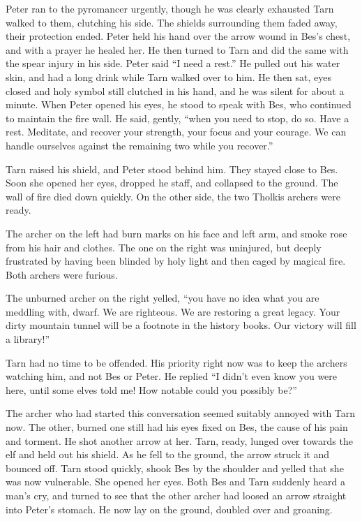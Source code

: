 Peter ran to the pyromancer urgently, though he was clearly exhausted  Tarn walked to them, clutching his side.  The shields surrounding them faded away, their protection ended.  Peter held his hand over the arrow wound in Bes's chest, and with a prayer he healed her.  He then turned to Tarn and did the same with the spear injury in his side.  Peter said ``I need a rest.''  He pulled out his water skin, and had a long drink while Tarn walked over to him.  He then sat, eyes closed and holy symbol still clutched in his hand, and he was silent for about a minute.  When Peter opened his eyes, he stood to speak with Bes, who continued to maintain the fire wall.  He said, gently, ``when you need to stop, do so.  Have a rest.  Meditate, and recover your strength, your focus and your courage.  We can handle ourselves against the remaining two while you recover.''

Tarn raised his shield, and Peter stood behind him.  They stayed close to Bes.  Soon she opened her eyes, dropped he staff, and collapsed to the ground.  The wall of fire died down quickly.  On the other side, the two Tholkis archers were ready.

The archer on the left had burn marks on his face and left arm, and smoke rose from his hair and clothes.  The one on the right was uninjured, but deeply frustrated by having been blinded by holy light and then caged by magical fire.  Both archers were furious.

The unburned archer on the right yelled, ``you have no idea what you are meddling with, dwarf.  We are righteous.  We are restoring a great legacy.  Your dirty mountain tunnel will be a footnote in the history books.  Our victory will fill a library!''

Tarn had no time to be offended.  His priority right now was to keep the archers watching him, and not Bes or Peter.  He replied ``I didn't even know you were here, until some elves told me!  How notable could you possibly be?''

The archer who had started this conversation seemed suitably annoyed with Tarn now.  The other, burned one still had his eyes fixed on Bes, the cause of his pain and torment.  He shot another arrow at her.  Tarn, ready, lunged over towards the elf and held out his shield.  As he fell to the ground, the arrow struck it and bounced off.  Tarn stood quickly, shook Bes by the shoulder and yelled that she was now vulnerable.  She opened her eyes.  Both Bes and Tarn suddenly heard a man's cry, and turned to see that the other archer had loosed an arrow straight into Peter's stomach.  He now lay on the ground, doubled over and groaning.

